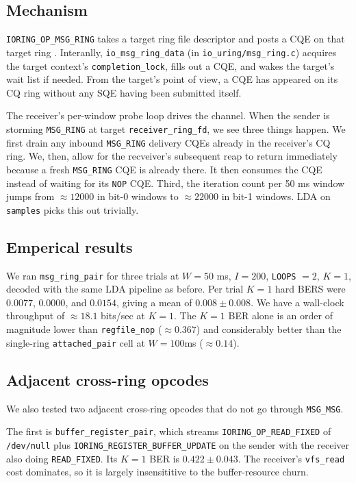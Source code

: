 \documentclass[letterpaper,twocolumn,10pt]{article}
\newcommand{\code}[1]{\texttt{#1}}
\begin{document}
\subsection{Mechanism}
\code{IORING\_OP\_MSG\_RING} takes a target ring file descriptor and posts a CQE on that target ring \cite{axboe_msg_ring}. Interanlly, \code{io\_msg\_ring\_data} (in \code{io\_uring/msg\_ring.c}) acquires the target context's \code{completion\_lock}, fills out a CQE, and wakes the target's wait list if needed. From the target's point of view, a CQE has appeared on its CQ ring without any SQE having been submitted itself.

The receiver's per-window probe loop drives the channel. When the sender is storming \code{MSG\_RING} at target \code{receiver\_ring\_fd}, we see three things happen. We first drain any inbound \code{MSG\_RING} delivery CQEs already in the receiver's CQ ring. We, then, allow for the recveiver's subsequent reap to return immediately because a fresh \code{MSG\_RING} CQE is already there. It then consumes the CQE instead of waiting for its \code{NOP} CQE. Third, the iteration count per 50 ms window jumps from $\approx 12000$ in bit-0 windows to $\approx 22000$ in bit-1 windows. LDA on \code{samples} picks this out trivially.

\subsection{Emperical results}
We ran \code{msg\_ring\_pair} for three trials at $W = 50$ ms, $I = 200$, \code{LOOPS} $=2$, $K = 1$, decoded with the same LDA pipeline as before. Per trial $K = 1$ hard BERS were $0.0077$, $0.0000$, and $0.0154$, giving a mean of $0.008 \pm 0.008$. We have a wall-clock throughput of $\approx 18.1$ bits/sec at $K = 1$. The $K = 1$ BER alone is an order of magnitude lower than \code{regfile\_nop} ($\approx 0.367$) and considerably better than the single-ring \code{attached\_pair} cell at $W = 100$ms ($\approx 0.14$). 

\subsection{Adjacent cross-ring opcodes}
We also tested two adjacent cross-ring opcodes that do not go through \code{MSG\_MSG}.

The first is \code{buffer\_register\_pair}, which streams \code{IORING\_OP\_READ\_FIXED} of \code{/dev/null} plus \code{IORING\_REGISTER\_BUFFER\_UPDATE} on the sender with the receiver also doing \code{READ\_FIXED}. Its $K=1$ BER is $0.422 \pm 0.043$. The receiver's \code{vfs\_read} cost dominates, so it is largely insensititive to the buffer-resource churn.
\end{document}
